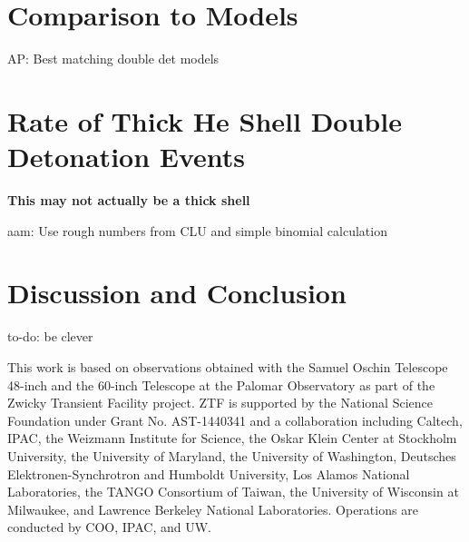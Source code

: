 \documentclass[twocolumn]{aastex63}
\newcommand{\abi}[1]{{\color{LincolnGreen} AP: {#1}}}
\newcommand{\aam}[1]{{\color{DarkOrange} aam: {#1}}}
\newcommand{\todo}[1]{{\color{magenta} to-do: {#1}}}
\begin{document}
\section{Comparison to Models}\label{sec:models}

\abi{Best matching double det models}


\section{Rate of Thick He Shell Double Detonation Events}\label{sec:rates}

\textbf{This may not actually be a thick shell}

\aam{Use rough numbers from CLU and simple binomial calculation}

\section{Discussion and Conclusion}\label{sec:conclusions}

\todo{be clever}

\acknowledgements

This work is based on observations obtained with the Samuel Oschin Telescope
48-inch and the 60-inch Telescope at the Palomar Observatory as part of the
Zwicky Transient Facility project. ZTF is supported by the National Science
Foundation under Grant No. AST-1440341 and a collaboration including Caltech,
IPAC, the Weizmann Institute for Science, the Oskar Klein Center at Stockholm
University, the University of Maryland, the University of Washington,
Deutsches Elektronen-Synchrotron and Humboldt University, Los Alamos National
Laboratories, the TANGO Consortium of Taiwan, the University of Wisconsin at
Milwaukee, and Lawrence Berkeley National Laboratories. Operations are
conducted by COO, IPAC, and UW.


\end{document}
